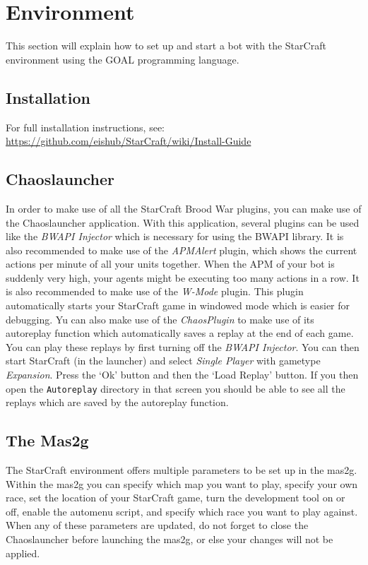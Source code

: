 \chapter{Environment}
This section will explain how to set up and start a bot with the StarCraft environment using the GOAL programming language.

\section{Installation}
For full installation instructions, see: \url{https://github.com/eishub/StarCraft/wiki/Install-Guide}

\section{Chaoslauncher}
In order to make use of all the StarCraft Brood War plugins, you can make use of the Chaoslauncher application. With this application, several plugins can be used like the \textit{BWAPI Injector} which is necessary for using the BWAPI library. It is also recommended to make use of the \textit{APMAlert} plugin, which shows the current actions per minute of all your units together. When the APM of your bot is suddenly very high, your agents might be executing too many actions in a row. It is also recommended to make use of the \textit{W-Mode} plugin. This plugin automatically starts your StarCraft game in windowed mode which is easier for debugging. Yu can also make use of the \textit{ChaosPlugin} to make use of its autoreplay function which automatically saves a replay at the end of each game. You can play these replays by first turning off the \textit{BWAPI Injector}. You can then start StarCraft (in the launcher) and select \textit{Single Player} with gametype \textit{Expansion}. Press the `Ok' button and then the `Load Replay' button. If you then open the 
\texttt{Autoreplay} directory in that screen you should be able to see all the replays which are saved by the autoreplay function.

\section{The Mas2g}
\label{mas2g}
The StarCraft environment offers multiple parameters to be set up in the mas2g. Within the mas2g you can specify which map you want to play, specify your own race, set the location of your StarCraft game, turn the development tool on or off, enable the automenu script, and specify which race you want to play against. When any of these parameters are updated, do not forget to close the Chaoslauncher before launching the mas2g, or else your changes will not be applied.


